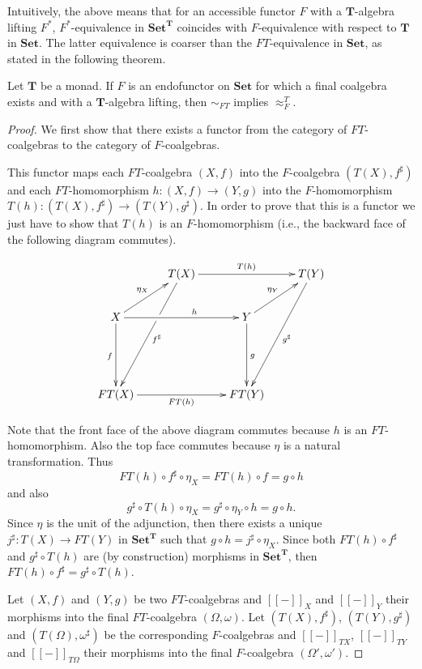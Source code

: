 \documentclass{LMCS}
\def\T{\mathbf{T}}
\def\Set{\mathbf{Set}}
\newcommand{\bb}[1]{[\![ #1 ]\!]}
\begin{document}
Intuitively, the above means that for an accessible functor $F$ with a $\T$-algebra
lifting $F^*$, $F^*$-equivalence in $\Set^\T$ coincides with $F$-equivalence
with respect to $\T$ in $\Set$. The latter equivalence is coarser than the
$FT$-equivalence in $\Set$, as stated in the following theorem.
\begin{thm}\label{thm:main}
Let $\T$ be a monad. If $F$ is an endofunctor on $\Set$ for which a final coalgebra exists and with a $\T$-algebra lifting,
then $\sim_{FT}$ implies $\approx_F^T$.
\end{thm}
\begin{proof}
We first show that there exists a functor from the category of
$FT$-coalgebras to the category of $F$-coalgebras.

This functor maps each $FT$-coalgebra $(X,f)$ into the $F$-coalgebra
$(T(X),f^{\sharp})$ and each $FT$-homomorphism $h \colon (X,f) \to (Y,g)$
into the $F$-homomorphism $T(h) \colon (T(X),f^{\sharp}) \to
(T(Y),g^{\sharp})$.
In order to prove that this is a functor we just have to show that
$T(h)$ is an $F$-homomorphism (i.e., the backward face of the
following diagram commutes).

$$\xymatrix{ & T(X) \ar@{}[dddl]^{f^{\sharp}} \ar[dddl]|(0.36){\hole} \ar[rr]^{T(h)}& & T(Y) \ar[dddl]^{g^{\sharp}}\\
X \ar[rr]^(0.6)h \ar[dd]_f \ar[ur]^{\eta_X} & & Y \ar[dd]^g \ar[ur]^{\eta_Y} \\
\\
FT(X) \ar[rr]_{FT(h)}& & FT(Y)} $$



Note that the front face of the above diagram commutes because $h$ is
an $FT$-homomorphism. Also the top face commutes because $\eta$ is
a natural transformation. Thus $$FT(h)\circ f^{\sharp}\circ \eta_X = FT(h)\circ f = g \circ h$$
 and also  $$g^{\sharp} \circ T(h)\circ \eta_X = g^{\sharp} \circ \eta_Y \circ h = g \circ h\text{.}$$
Since $\eta$ is the
unit of the adjunction, then there exists a unique
$j^{\sharp}\colon T(X)\to FT(Y)$ in $\Set^{\T}$ such that $g \circ
h=j^{\sharp}\circ \eta_X$. Since both $FT(h)\circ f^{\sharp}$ and
$g^{\sharp} \circ T(h)$ are (by construction) morphisms in
$\Set^{\T}$, then $FT(h)\circ f^{\sharp} = g^{\sharp} \circ T(h)$.

Let $(X, f)$ and $(Y,g)$ be two $FT$-coalgebras and $\bb{-}_X$ and $\bb{-}_Y$ their morphisms into the final $FT$-coalgebra $(\Omega, \omega)$.
Let $(T(X),f^{\sharp})$, $(T(Y),g^{\sharp})$ and $(T(\Omega), \omega^{\sharp})$ be the corresponding $F$-coalgebras and $\bb{-}_{TX}$, $\bb{-}_{TY}$ and $\bb{-}_{T\Omega}$
their morphisms into the final $F$-coalgebra $(\Omega', \omega')$.



\end{proof}
\end{document}
